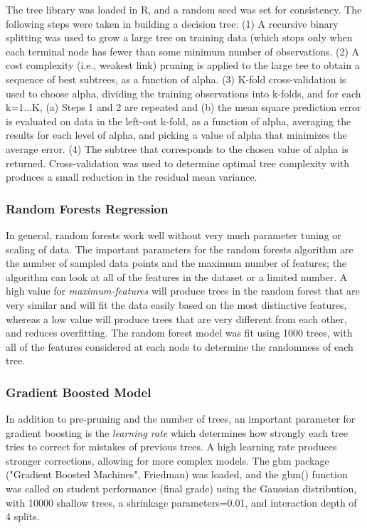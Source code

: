 \documentclass[sigconf]{acmart}
\begin{document}
The tree library was loaded in R, and a random seed was set for consistency. 
The following steps were taken in building a decision tree: (1) A recursive 
binary splitting was used to grow a large tree on training data (which 
stops only when each terminal node has fewer than some minimum number of
observations. (2) A cost complexity (i.e., weakest link) pruning is applied
to the large tee to obtain a sequence of best subtrees, as a function of alpha. 
(3) K-fold cross-validation is used to choose alpha, dividing the training 
observations into k-folds, and for each k=1...K, (a) Steps 1 and 2 are 
repeated and (b) the mean square prediction error is evaluated on data in the 
left-out k-fold, as a function of alpha, averaging the results for each level 
of alpha, and picking a value of alpha that minimizes the average error. 
(4) The subtree that corresponds to the chosen value of alpha is returned.
Cross-validation was used to determine optimal tree complexity with produces 
a small reduction in the residual mean variance. 


\subsubsection{Random Forests Regression} 

In general, random forests work well without very much parameter tuning or 
scaling of data. The important parameters for the random forests algorithm are 
the number of sampled data points and the maximum number of features; the 
algorithm can look at all of the features in the dataset or a limited number. 
A high value for \emph{maximum-features} will produce trees in the random 
forest that are very similar and will fit the data easily based on the most 
distinctive features, whereas a low value will produce trees that are very
different from each other, and reduces overfitting. The random forest model was 
fit using 1000 trees, with all of the features considered at each node to 
determine the randomness of each tree. 


\subsubsection{Gradient Boosted Model} 

In addition to pre-pruning and the number of trees, an important parameter 
for gradient boosting is the \emph{learning rate} which determines how 
strongly each tree tries to correct for mistakes of previous trees. A high 
learning rate produces stronger corrections, allowing for more complex models. 
The gbm package ("Gradient Boosted Machines", Friedman) was loaded, and the 
gbm() function was called on student performance (final grade) using the 
Gaussian distribution, with 10000 shallow trees, a shrinkage parameters=0.01, 
and interaction depth of 4 splits. 
\end{document}
